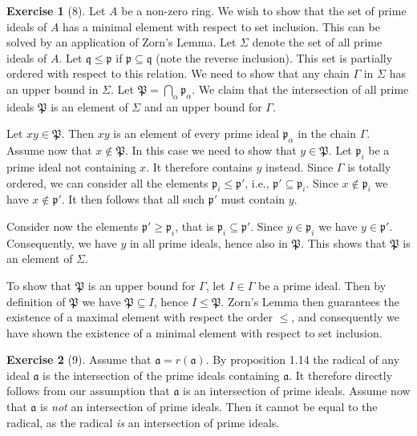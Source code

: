 \documentclass{article}
\theoremstyle{definition}
\newtheorem*{exercise}{Exercise}
\begin{document}
\begin{exercise}[8] Let $A$ be a non-zero ring. We wish to show that the
	set of prime ideals of $A$ has a minimal element with respect to
	set inclusion.  This can be solved by an application of Zorn's
	Lemma. 	Let $\Sigma$ denote the set of all prime ideals of $A$.
	Let $\mathfrak{q} \leq \mathfrak{p}$ if $\mathfrak{p} \subseteq
	\mathfrak{q}$ (note the reverse inclusion).  This set is partially
	ordered with respect to this relation. We need to show that any
	chain $\Gamma$ in $\Sigma$ has an upper bound in $\Sigma$.  Let
	$\mathfrak{P} = \bigcap_{\alpha} \mathfrak{p}_\alpha$. We claim
	that the intersection of all prime ideals $\mathfrak{P}$ is an
	element of $\Sigma$ and an upper bound for $\Gamma$.

	Let $xy \in \mathfrak{P}$. Then $xy$ is an element of every prime
	ideal $\mathfrak{p}_\alpha$ in the chain $\Gamma$.  Assume now
	that $x \notin \mathfrak{P}$. In this case we need to show that $y
	\in \mathfrak{P}$. Let $\mathfrak{p}_i$ be a prime ideal not
	containing $x$. It therefore contains $y$ instead. Since $\Gamma$
	is totally ordered, we can consider all the elements
	$\mathfrak{p}_i \leq \mathfrak{p}'$, i.e., $\mathfrak{p}'
	\subseteq \mathfrak{p}_i$. Since $x \notin \mathfrak{p}_i$ we have
	$x \notin \mathfrak{p}'$. It then follows that all such
	$\mathfrak{p}'$ must contain $y$. 

	Consider now the elements $\mathfrak{p}' \geq \mathfrak{p}_i$,
	that is $\mathfrak{p}_i \subseteq \mathfrak{p}'$. Since $y \in
	\mathfrak{p}_i$ we have $y \in \mathfrak{p}'$. Consequently, we
	have $y$ in all prime ideals, hence also in $\mathfrak{P}$. This
	shows that $\mathfrak{P}$ is an element of $\Sigma$.

	To show that $\mathfrak{P}$ is an upper bound for $\Gamma$, let $I \in
	\Gamma$ be a prime ideal. Then by definition of $\mathfrak{P}$ we have
	$\mathfrak{P} \subseteq I$, hence $I \leq \mathfrak{P}$.  Zorn's Lemma
	then guarantees the existence of a maximal element with respect the
	order $\leq$, and consequently we have shown the existence of a minimal
	element with respect to set inclusion.
\end{exercise}  

\begin{exercise}[9]
	Assume that $\mathfrak{a} = r(\mathfrak{a})$. By proposition 1.14 the
	radical of any ideal $\mathfrak{a}$ is the intersection of the prime
	ideals containing $\mathfrak{a}$. It therefore directly follows from
	our assumption that $\mathfrak{a}$ is an intersection of prime ideals.
	Assume now that $\mathfrak{a}$ is \emph{not} an intersection of prime
	ideals. Then it cannot be equal to the radical, as the radical
	\emph{is} an intersection of prime ideals.
\end{exercise}
\end{document}
